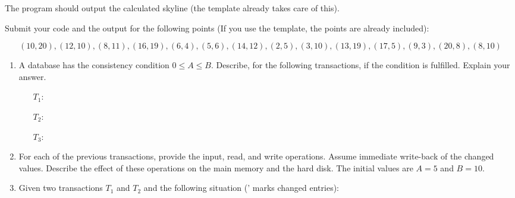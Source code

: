 The program should output the calculated skyline (the template already takes care of this).

Submit your code and the output for the following points (If you use the template, the points are already included):

$$(10,20),(12,10),(8,11),(16,19),(6,4),(5,6),(14,12),(2,5),(3,10),(13,19),(17,5),(9,3),(20,8),(8,10)$$

\newpage


\begin{enumerate}
	\item A database has the consistency condition $0\leq A\leq B$. Describe, for the following transactions, if the condition is fulfilled. Explain your answer.

    \begin{enumerate}

    \item[$T_1: $] 
    \item[$T_2: $] 
    \item[$T_3: $] 
    \end{enumerate}

\item For each of the previous transactions, provide the input, read, and write operations. Assume immediate write-back of the changed values. Describe the effect of these operations on the main memory and the hard disk. The initial values are $A=5$ and $B=10$.

\item Given two transactions $T_1$ and $T_2$ and the following situation (' marks changed entries):

 \begin{center}

\end{center}
\end{enumerate}
